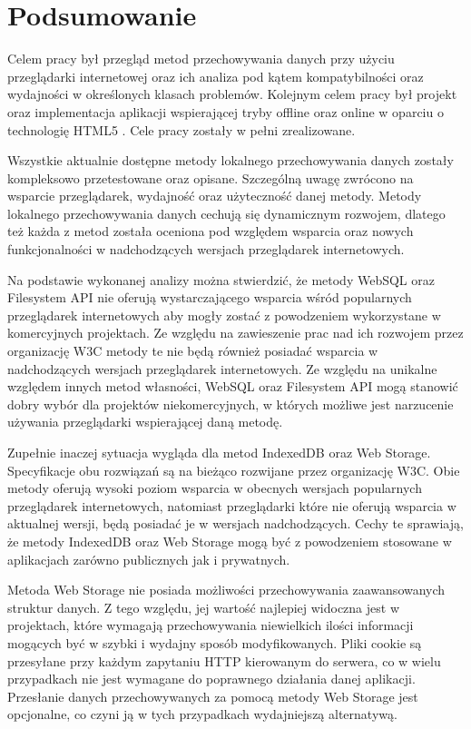 \chapter{Podsumowanie}
\label{cha:podsumowanie}

Celem pracy był przegląd metod przechowywania danych przy użyciu przeglądarki internetowej oraz ich analiza pod kątem kompatybilności oraz wydajności w określonych klasach problemów. Kolejnym celem pracy był projekt oraz implementacja aplikacji wspierającej tryby offline oraz online w oparciu o technologię HTML5 . Cele pracy zostały w pełni zrealizowane.

Wszystkie aktualnie dostępne metody lokalnego przechowywania danych zostały kompleksowo przetestowane oraz opisane. Szczególną uwagę zwrócono na wsparcie przeglądarek, wydajność oraz użyteczność danej metody. Metody lokalnego przechowywania danych cechują się dynamicznym rozwojem, dlatego też każda z metod została oceniona pod względem wsparcia oraz nowych funkcjonalności w nadchodzących wersjach przeglądarek internetowych.

Na podstawie wykonanej analizy można stwierdzić, że metody WebSQL oraz Filesystem API nie oferują wystarczającego wsparcia wśród popularnych przeglądarek internetowych aby mogły zostać z powodzeniem wykorzystane w komercyjnych projektach. Ze względu na zawieszenie prac nad ich rozwojem przez organizację W3C metody te nie będą również posiadać wsparcia w nadchodzących wersjach przeglądarek internetowych. Ze względu na unikalne względem innych metod własności, WebSQL oraz Filesystem API mogą stanowić dobry wybór dla projektów niekomercyjnych, w których możliwe jest narzucenie używania przeglądarki wspierającej daną metodę.

Zupełnie inaczej sytuacja wygląda dla metod IndexedDB oraz Web Storage. Specyfikacje obu rozwiązań są na bieżąco rozwijane przez organizację W3C. Obie metody oferują wysoki poziom wsparcia w obecnych wersjach popularnych przeglądarek internetowych, natomiast przeglądarki które nie oferują wsparcia w aktualnej wersji, będą posiadać je w wersjach nadchodzących. Cechy te sprawiają, że metody IndexedDB oraz Web Storage mogą być z powodzeniem stosowane w aplikacjach zarówno publicznych jak i prywatnych.

Metoda Web Storage nie posiada możliwości przechowywania zaawansowanych struktur danych. Z tego względu, jej wartość najlepiej widoczna jest w projektach, które wymagają przechowywania niewielkich ilości informacji mogących być w szybki i wydajny sposób modyfikowanych. Pliki cookie są przesyłane przy każdym zapytaniu HTTP kierowanym do serwera, co w wielu przypadkach nie jest wymagane do poprawnego działania danej aplikacji. Przesłanie danych przechowywanych za pomocą metody Web Storage jest opcjonalne, co czyni ją w tych przypadkach wydajniejszą alternatywą.

